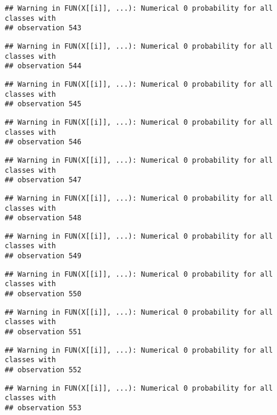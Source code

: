 \documentclass[
]{article}
\begin{document}
\begin{verbatim}
## Warning in FUN(X[[i]], ...): Numerical 0 probability for all classes with
## observation 543
\end{verbatim}

\begin{verbatim}
## Warning in FUN(X[[i]], ...): Numerical 0 probability for all classes with
## observation 544
\end{verbatim}

\begin{verbatim}
## Warning in FUN(X[[i]], ...): Numerical 0 probability for all classes with
## observation 545
\end{verbatim}

\begin{verbatim}
## Warning in FUN(X[[i]], ...): Numerical 0 probability for all classes with
## observation 546
\end{verbatim}

\begin{verbatim}
## Warning in FUN(X[[i]], ...): Numerical 0 probability for all classes with
## observation 547
\end{verbatim}

\begin{verbatim}
## Warning in FUN(X[[i]], ...): Numerical 0 probability for all classes with
## observation 548
\end{verbatim}

\begin{verbatim}
## Warning in FUN(X[[i]], ...): Numerical 0 probability for all classes with
## observation 549
\end{verbatim}

\begin{verbatim}
## Warning in FUN(X[[i]], ...): Numerical 0 probability for all classes with
## observation 550
\end{verbatim}

\begin{verbatim}
## Warning in FUN(X[[i]], ...): Numerical 0 probability for all classes with
## observation 551
\end{verbatim}

\begin{verbatim}
## Warning in FUN(X[[i]], ...): Numerical 0 probability for all classes with
## observation 552
\end{verbatim}

\begin{verbatim}
## Warning in FUN(X[[i]], ...): Numerical 0 probability for all classes with
## observation 553
\end{verbatim}
\end{document}
